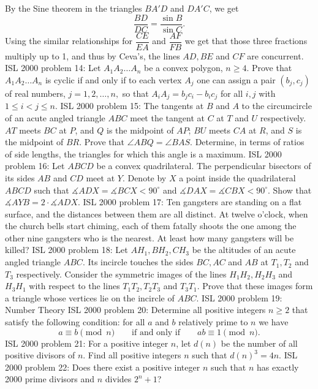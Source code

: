 By the Sine theorem in the triangles $ BA'D$ and $ DA'C$, we get
\[ \dfrac {BD}{DC} = \dfrac { \sin B }{\sin C }. \]
Using the similar relationships for  $ \dfrac {CE}{EA}$ and $ \dfrac {AF}{FB}$ we get that those three fractions multiply up to 1, and thus by Ceva's, the lines $ AD, BE$ and $ CF$ are concurrent. 
ISL 2000 problem 14:  Let $ A_1A_2 \ldots A_n$ be a convex polygon, $ n \geq 4.$ Prove that $ A_1A_2 \ldots A_n$ is cyclic if and only if to each vertex $ A_j$ one can assign a pair $ (b_j, c_j)$ of real numbers, $ j = 1, 2, \ldots, n,$ so that $ A_iA_j = b_jc_i - b_ic_j$ for all $ i, j$ with $ 1 \leq i < j \leq n.$ 
ISL 2000 problem 15:  The tangents at $B$ and $A$ to the circumcircle of an acute angled triangle $ABC$ meet the tangent at $C$ at $T$ and $U$ respectively.  $AT$ meets $BC$ at $P$, and $Q$ is the midpoint of $AP$; $BU$ meets $CA$ at $R$, and $S$ is the midpoint of $BR$.  Prove that $\angle ABQ=\angle BAS$.  Determine, in terms of ratios of side lengths, the triangles for which this angle is a maximum. 
ISL 2000 problem 16:  Let $ ABCD$ be a convex quadrilateral. The perpendicular bisectors of its sides $ AB$ and $ CD$ meet at $ Y$. Denote by $ X$ a point inside the quadrilateral $ ABCD$ such that $ \measuredangle ADX = \measuredangle BCX < 90^{\circ}$ and $ \measuredangle DAX = \measuredangle CBX < 90^{\circ}$. Show that $ \measuredangle AYB = 2\cdot\measuredangle ADX$. 
ISL 2000 problem 17:  Ten gangsters are standing on a flat surface, and the distances between them are all distinct. At twelve o’clock, when the church bells start chiming, each of them fatally shoots the one among the other nine gangsters who is the nearest. At least how many gangsters will be killed? 
ISL 2000 problem 18:  Let $ AH_1, BH_2, CH_3$ be the altitudes of an acute angled triangle $ ABC$. Its incircle touches the sides $ BC, AC$ and $ AB$ at $ T_1, T_2$ and $ T_3$ respectively. Consider the symmetric images  of  the  lines $ H_1H_2, H_2H_3$ and $ H_3H_1$ with  respect  to  the  lines $ T_1T_2, T_2T_3$ and $ T_3T_1$.  Prove  that  these  images  form a  triangle  whose  vertices  lie  on  the incircle of $ ABC$. 
ISL 2000 problem 19:  Number Theory 
ISL 2000 problem 20:  Determine all positive integers $ n\geq 2$ that satisfy the following condition: for all $ a$ and $ b$ relatively prime to $ n$ we have
\[ a \equiv b \pmod n\qquad\text{if and only if}\qquad ab\equiv 1 \pmod n. \] 
ISL 2000 problem 21:  For a positive integer $n$, let $d(n)$ be the number of all positive divisors of $n$. Find all positive integers $n$ such that $d(n)^3=4n$. 
ISL 2000 problem 22:  Does there exist a positive integer $ n$ such that $ n$ has exactly 2000 prime divisors and $ n$ divides $ 2^n + 1$? 
